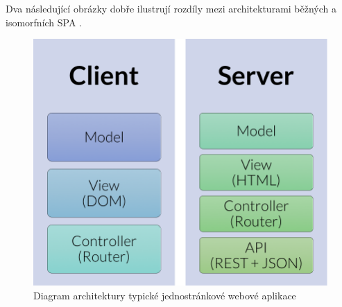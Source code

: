 Dva následující obrázky dobře ilustrují rozdíly mezi architekturami běžných a isomorfních SPA \cite{codepicnic_universaljs}.
\begin{figure}[h]
\begin{centering}
\includegraphics[scale=0.5]{obrazky/classic_webpage_architecture}
\par\end{centering}
\caption{Diagram architektury typické jednostránkové webové aplikace \cite{codepicnic_universaljs} \label{fig:classic-web-arch-diagram}}
\end{figure}

